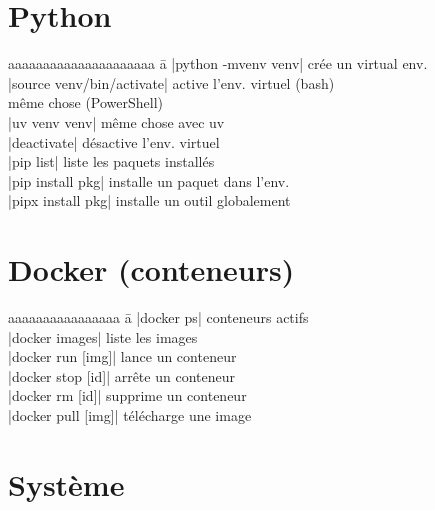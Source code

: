 \documentclass{article}
\begin{document}
\begin{multicols}{4}
    \section*{Python}
    \begin{tabbing}
        aaaaaaaaaaaaaaaaaaaaa \= a \kill
        \code|python -mvenv venv| \> crée un virtual env. \\
        \code|source venv/bin/activate| \> active l'env. virtuel (bash) \\
         \> même chose (PowerShell) \\
        \code|uv venv venv| \> même chose avec uv \\
        \code|deactivate| \> désactive l'env. virtuel \\
        \code|pip list| \> liste les paquets installés \\
        \code|pip install pkg| installe un paquet dans l'env. \\
        \code|pipx install pkg| installe un outil globalement \\
    \end{tabbing}

    \section*{Docker (conteneurs)}
    \begin{tabbing}
        aaaaaaaaaaaaaaaa \= a \kill
        \code|docker ps| \> conteneurs actifs \\
        \code|docker images| \> liste les images \\
        \code|docker run [img]| \> lance un conteneur \\
        \code|docker stop [id]| \> arrête un conteneur \\
        \code|docker rm [id]| \> supprime un conteneur \\
        \code|docker pull [img]| \> télécharge une image
    \end{tabbing}

    \section*{Système}


\end{multicols}
\end{document}
